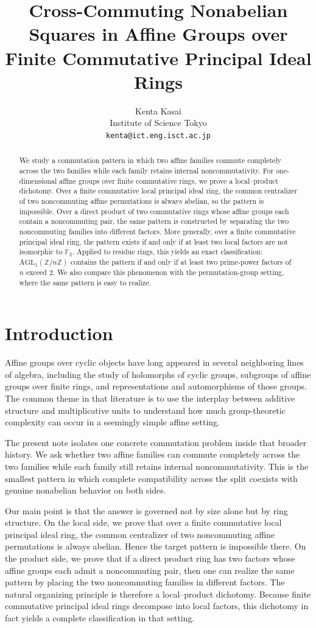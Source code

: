 \documentclass[11pt]{article}
\title{Cross-Commuting Nonabelian Squares in Affine Groups over Finite Commutative Principal Ideal Rings}
\author{Kenta Kasai\\
Institute of Science Tokyo\\
\texttt{kenta@ict.eng.isct.ac.jp}}
\date{}
\newcommand{\Z}{\mathbb{Z}}
\newcommand{\AGL}{\mathrm{AGL}_1}
\theoremstyle{uprightthm}
\begin{document}
\maketitle

\begin{abstract}
We study a commutation pattern in which two affine families commute completely
across the two families while each family retains internal noncommutativity.
For one-dimensional affine groups over finite commutative rings, we prove a
local--product dichotomy. Over a finite commutative local principal ideal ring,
the common centralizer of two noncommuting affine permutations is always
abelian, so the pattern is impossible. Over a direct product of two
commutative rings whose affine groups each contain a noncommuting pair, the
same pattern is constructed by separating the two noncommuting families into
different factors. More generally, over a finite commutative principal ideal
ring, the pattern exists if and only if at least two local factors are not
isomorphic to $\mathbb F_2$. Applied to residue rings, this yields an exact
classification: $\AGL(\Z/n\Z)$ contains the pattern if and only if at least
two prime-power factors of $n$ exceed $2$. We also compare this phenomenon with
the permutation-group setting, where the same pattern is easy to realize.
\end{abstract}

\section{Introduction}
Affine groups over cyclic objects have long appeared in several neighboring
lines of algebra, including the study of holomorphs of cyclic groups,
subgroups of affine groups over finite rings, and representations and
automorphisms of those groups. The common theme in that literature is to use
the interplay between additive structure and multiplicative units to understand
how much group-theoretic complexity can occur in a seemingly simple affine
setting.

The present note isolates one concrete commutation problem inside that broader
history. We ask whether two affine families can commute completely across the
two families while each family still retains internal noncommutativity. This is
the smallest pattern in which complete compatibility across the split coexists
with genuine nonabelian behavior on both sides.

Our main point is that the answer is governed not by size alone but by ring
structure. On the local side, we prove that over a finite commutative local
principal ideal ring, the common centralizer of two noncommuting affine
permutations is always abelian. Hence the target pattern is impossible there.
On the product side, we prove that if a direct product ring has two factors
whose affine groups each admit a noncommuting pair, then one can realize the
same pattern by placing the two noncommuting families in different factors. The
natural organizing principle is therefore a local--product dichotomy.
Because finite commutative principal ideal rings decompose into local factors,
this dichotomy in fact yields a complete classification in that setting.
\end{document}
